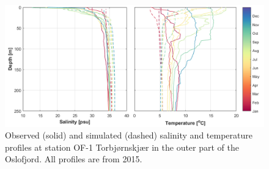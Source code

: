 \begin{figure}[htb]
	\centerline{
		\includegraphics*[trim=0cm 0cm 0cm 0cm,clip=true,width=\textwidth]{Figurer/CTD_OF-1} }
	\caption{\small Observed (solid) and simulated (dashed) salinity and temperature profiles at station OF-1 Torbj{\o}rnskj{\ae}r in the outer part of the Oslofjord. All profiles are from 2015.}
	\label{fig:CTD_OF-1}
\end{figure}

